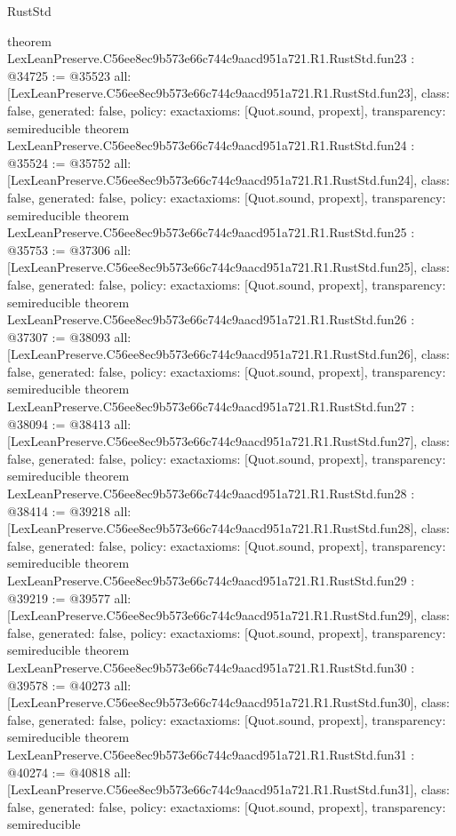 \begin{lexlean}{RustStd}
\begin{coremodule}
{}
theorem LexLeanPreserve.C56ee8ec9b573e66c744c9aacd951a721.R1.RustStd.fun23 : @34725 := @35523 {
  all: [LexLeanPreserve.C56ee8ec9b573e66c744c9aacd951a721.R1.RustStd.fun23],
  class: false,
  generated: false,
  policy: exact{axioms: [Quot.sound, propext]},
  transparency: semireducible
}
theorem LexLeanPreserve.C56ee8ec9b573e66c744c9aacd951a721.R1.RustStd.fun24 : @35524 := @35752 {
  all: [LexLeanPreserve.C56ee8ec9b573e66c744c9aacd951a721.R1.RustStd.fun24],
  class: false,
  generated: false,
  policy: exact{axioms: [Quot.sound, propext]},
  transparency: semireducible
}
theorem LexLeanPreserve.C56ee8ec9b573e66c744c9aacd951a721.R1.RustStd.fun25 : @35753 := @37306 {
  all: [LexLeanPreserve.C56ee8ec9b573e66c744c9aacd951a721.R1.RustStd.fun25],
  class: false,
  generated: false,
  policy: exact{axioms: [Quot.sound, propext]},
  transparency: semireducible
}
theorem LexLeanPreserve.C56ee8ec9b573e66c744c9aacd951a721.R1.RustStd.fun26 : @37307 := @38093 {
  all: [LexLeanPreserve.C56ee8ec9b573e66c744c9aacd951a721.R1.RustStd.fun26],
  class: false,
  generated: false,
  policy: exact{axioms: [Quot.sound, propext]},
  transparency: semireducible
}
theorem LexLeanPreserve.C56ee8ec9b573e66c744c9aacd951a721.R1.RustStd.fun27 : @38094 := @38413 {
  all: [LexLeanPreserve.C56ee8ec9b573e66c744c9aacd951a721.R1.RustStd.fun27],
  class: false,
  generated: false,
  policy: exact{axioms: [Quot.sound, propext]},
  transparency: semireducible
}
theorem LexLeanPreserve.C56ee8ec9b573e66c744c9aacd951a721.R1.RustStd.fun28 : @38414 := @39218 {
  all: [LexLeanPreserve.C56ee8ec9b573e66c744c9aacd951a721.R1.RustStd.fun28],
  class: false,
  generated: false,
  policy: exact{axioms: [Quot.sound, propext]},
  transparency: semireducible
}
theorem LexLeanPreserve.C56ee8ec9b573e66c744c9aacd951a721.R1.RustStd.fun29 : @39219 := @39577 {
  all: [LexLeanPreserve.C56ee8ec9b573e66c744c9aacd951a721.R1.RustStd.fun29],
  class: false,
  generated: false,
  policy: exact{axioms: [Quot.sound, propext]},
  transparency: semireducible
}
theorem LexLeanPreserve.C56ee8ec9b573e66c744c9aacd951a721.R1.RustStd.fun30 : @39578 := @40273 {
  all: [LexLeanPreserve.C56ee8ec9b573e66c744c9aacd951a721.R1.RustStd.fun30],
  class: false,
  generated: false,
  policy: exact{axioms: [Quot.sound, propext]},
  transparency: semireducible
}
theorem LexLeanPreserve.C56ee8ec9b573e66c744c9aacd951a721.R1.RustStd.fun31 : @40274 := @40818 {
  all: [LexLeanPreserve.C56ee8ec9b573e66c744c9aacd951a721.R1.RustStd.fun31],
  class: false,
  generated: false,
  policy: exact{axioms: [Quot.sound, propext]},
  transparency: semireducible
}
\end{coremodule}
\end{lexlean}
